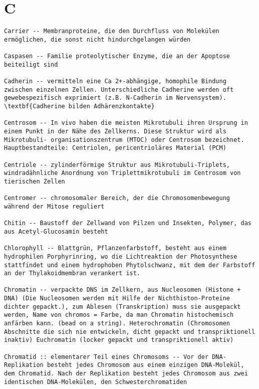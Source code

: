 \documentclass{article}
\begin{document}
\section{C}
\begin{verbatim}
Carrier -- Membranproteine, die den Durchfluss von Molekülen ermöglichen, die sonst nicht hindurchgelangen würden

Caspasen -- Familie proteolytischer Enzyme, die an der Apoptose beiteiligt sind

Cadherin -- vermitteln eine Ca 2+-abhängige, homophile Bindung zwischen einzelnen Zellen. Unterschiedliche Cadherine werden oft gewebespezifisch exprimiert (z.B. N-Cadherin im Nervensystem). \textbf{Cadherine bilden Adhärenzkontakte}

Centrosom -- In vivo haben die meisten Mikrotubuli ihren Ursprung in einem Punkt in der Nähe des Zellkerns. Diese Struktur wird als Mikrotubuli- organisationszentrum (MTOC) oder Centrosom bezeichnet. Hauptbestandteile: Centriolen, pericentrioläres Material (PCM)

Centriole -- zylinderförmige Struktur aus Mikrotubuli-Triplets, windradähnliche Anordnung von Triplettmikrotubuli im Centrosom von tierischen Zellen

Centromer -- chromosomaler Bereich, der die Chromosomenbewegung während der Mitose reguliert

Chitin -- Baustoff der Zellwand von Pilzen und Insekten, Polymer, das aus Acetyl-Glucosamin besteht

Chlorophyll -- Blattgrün, Pflanzenfarbstoff, besteht aus einem hydrophilen Porphyrinring, wo die Lichtreaktion der Photosynthese stattfindet und einem hydrophoben Phytolschwanz, mit dem der Farbstoff an der Thylakoidmembran verankert ist.

Chromatin -- verpackte DNS im Zellkern, aus Nucleosomen (Histone + DNA) (Die Nucleosomen werden mit Hilfe der Nichthiston-Proteine dichter gepackt.), zum Ablesen (Transkription) muss sie ausgepackt werden, Name von chromos = Farbe, da man Chromatin histochemisch anfärben kann. (bead on a string). Heterochromatin (Chromosomen Abschnitte die sich nie entwickeln, dicht gepackt und transpriktionell inaktiv) Euchromatin (locker gepackt und transpriktionell aktiv)

Chromatid :: elementarer Teil eines Chromosoms -- Vor der DNA-Replikation besteht jedes Chromosom aus einem einzigen DNA-Molekül, dem Chromatid. Nach der Replikation besteht jedes Chromosom aus zwei identischen DNA-Molekülen, den Schwesterchromatiden


\end{verbatim}
\end{document}
